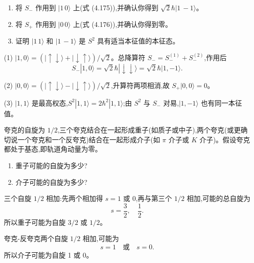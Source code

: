 \begin{question}
\begin{enumerate}
\item 将 $S_-$ 作用到 $|1\,0\rangle$ 上(式 (4.175)),并确认你得到 $\sqrt2\hbar |1\,-1\rangle$。
\item 将 $S_+$ 作用到 $|0\,0\rangle$ 上(式 (4.176)),并确认你得到零。
\item 证明 $|1\,1\rangle$ 和 $|1\,-1\rangle$ 是 $S^2$ 具有适当本征值的本征态。
\end{enumerate}

\par\smallskip
{}

\end{question}
\begin{solution}

(1) $|1,0\rangle=(|\uparrow\downarrow\rangle+|\downarrow\uparrow\rangle)/\sqrt2$。总降算符 $S_-=S_-^{(1)}+S_-^{(2)}$,作用后
\[
S_-|1,0\rangle=\sqrt2\hbar|\downarrow\downarrow\rangle=\sqrt2\hbar|1,-1\rangle.
\]

(2) $|0,0\rangle=(|\uparrow\downarrow\rangle-|\downarrow\uparrow\rangle)/\sqrt2$,升算符两项相消,故 $S_+|0,0\rangle=0$。

(3) $|1,1\rangle$ 是最高权态,$S^2|1,1\rangle=2\hbar^2|1,1\rangle$;由 $S^2$ 与 $S_-$ 对易,$|1,-1\rangle$ 也有同一本征值。

\end{solution}

\begin{question}
夸克的自旋为 $1/2$,三个夸克结合在一起形成重子(如质子或中子),两个夸克(或更确切说一个夸克和一个反夸克)结合在一起形成介子(如 $\pi$ 介子或 $K$ 介子)。假设夸克都处于基态,即轨道角动量为零。
\begin{enumerate}
\item 重子可能的自旋为多少?
\item 介子可能的自旋为多少?
\end{enumerate}
\end{question}
\begin{solution}

三个自旋 $1/2$ 相加:先两个相加得 $s=1$ 或 $0$,再与第三个 $1/2$ 相加,可能的总自旋为
\[
s=\frac32,\quad \frac12.
\]
所以重子可能为自旋 $3/2$ 或 $1/2$。

夸克-反夸克两个自旋 $1/2$ 相加,可能为
\[
s=1\quad \text{或}\quad s=0.
\]
所以介子可能为自旋 1 或 0。

\end{solution}


